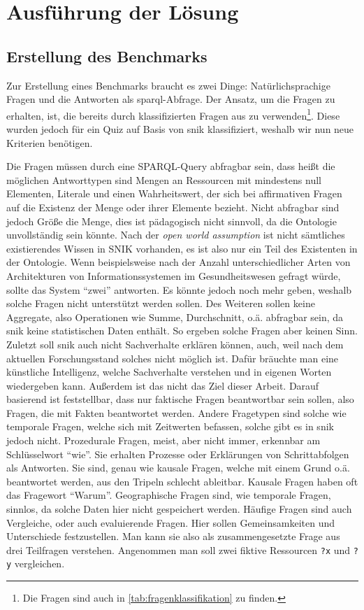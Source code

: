 \chapter{Ausführung der Lösung}\label{ch:solution}

\section{Erstellung des Benchmarks}
Zur Erstellung eines Benchmarks braucht es zwei Dinge:
Natürlichsprachige Fragen und die Antworten als \ac{sparql}-Abfrage.
Der Ansatz, um die Fragen zu erhalten, ist, die bereits durch \citet{arneba} klassifizierten Fragen aus \citet{bb} zu verwenden\footnote{Die Fragen sind auch in \cref{tab:fragenklassifikation} zu finden.}.
Diese wurden jedoch für ein Quiz auf Basis von \ac{snik} klassifiziert, weshalb wir nun neue Kriterien benötigen.

Die Fragen müssen durch eine SPARQL-Query abfragbar sein, dass heißt die möglichen Antworttypen sind Mengen an Ressourcen mit mindestens null Elementen, Literale und einen Wahrheitswert,
der sich bei affirmativen Fragen auf die Existenz der Menge oder ihrer Elemente bezieht.
Nicht abfragbar sind jedoch Größe die Menge, dies ist pädagogisch nicht sinnvoll, da die Ontologie unvollständig sein könnte.
Nach der \emph{open world assumption} ist nicht sämtliches existierendes Wissen in SNIK vorhanden, es ist also nur ein Teil des Existenten in der Ontologie.
Wenn beispielsweise nach der Anzahl unterschiedlicher Arten von Architekturen von Informationssystemen im Gesundheitswesen gefragt würde, sollte das System \enquote{zwei} antworten.
Es könnte jedoch noch mehr geben, weshalb solche Fragen nicht unterstützt werden sollen.
Des Weiteren sollen keine Aggregate, also Operationen wie Summe, Durchschnitt, o.ä. abfragbar sein, da \ac{snik} keine statistischen Daten enthält.
So ergeben solche Fragen aber keinen Sinn.
Zuletzt soll \ac{snik} auch nicht Sachverhalte erklären können, auch, weil nach dem aktuellen Forschungsstand solches nicht möglich ist.
Dafür bräuchte man eine künstliche Intelligenz, welche Sachverhalte verstehen und in eigenen Worten wiedergeben kann.
Außerdem ist das nicht das Ziel dieser Arbeit.
Darauf basierend ist feststellbar, dass nur faktische Fragen beantwortbar sein sollen, also Fragen, die mit Fakten beantwortet werden.
Andere Fragetypen sind solche wie temporale Fragen, welche sich mit Zeitwerten befassen, solche gibt es in \ac{snik} jedoch nicht.
Prozedurale Fragen, meist, aber nicht immer, erkennbar am Schlüsselwort \enquote{wie}.
Sie erhalten Prozesse oder Erklärungen von Schrittabfolgen als Antworten.
Sie sind, genau wie kausale Fragen, welche mit einem Grund o.ä. beantwortet werden, aus den Tripeln schlecht ableitbar.
Kausale Fragen haben oft das Fragewort \enquote{Warum}.
Geographische Fragen sind, wie temporale Fragen, sinnlos, da solche Daten hier nicht gespeichert werden.
Häufige Fragen sind auch Vergleiche, oder auch evaluierende Fragen.
Hier sollen Gemeinsamkeiten und Unterschiede festzustellen.
Man kann sie also als zusammengesetzte Frage aus drei Teilfragen verstehen.
Angenommen man soll zwei fiktive Ressourcen \texttt{?x} und \texttt{?y} vergleichen.

